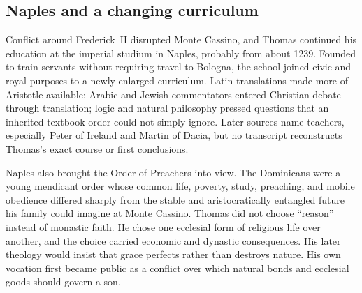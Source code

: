 \subsection{Naples and a changing curriculum}

Conflict around Frederick~II disrupted Monte Cassino, and Thomas continued his
education at the imperial studium in Naples, probably from about 1239.  Founded
to train servants without requiring travel to Bologna, the school joined civic
and royal purposes to a newly enlarged curriculum.  Latin translations made
more of Aristotle available; Arabic and Jewish commentators entered Christian
debate through translation; logic and natural philosophy pressed questions
that an inherited textbook order could not simply ignore.  Later sources name
teachers, especially Peter of Ireland and Martin of Dacia, but no transcript
reconstructs Thomas's exact course or first conclusions.

Naples also brought the Order of Preachers into view.  The Dominicans were a
young mendicant order whose common life, poverty, study, preaching, and mobile
obedience differed sharply from the stable and aristocratically entangled
future his family could imagine at Monte Cassino.  Thomas did not choose
``reason'' instead of monastic faith.  He chose one ecclesial form of religious
life over another, and the choice carried economic and dynastic consequences.
His later theology would insist that grace perfects rather than destroys
nature.  His own vocation first became public as a conflict over which natural
bonds and ecclesial goods should govern a son.

